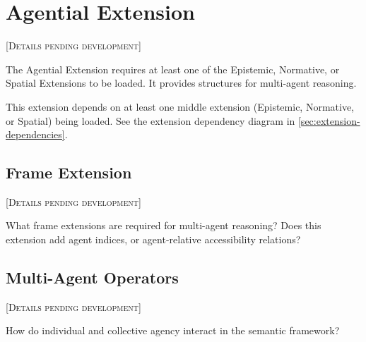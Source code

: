 \documentclass[../LogosReference.tex]{subfiles}
\begin{document}

\section{Agential Extension}\label{sec:agential}

\textsc{[Details pending development]}

The Agential Extension requires at least one of the Epistemic, Normative, or Spatial Extensions to be loaded.
It provides structures for multi-agent reasoning.

\begin{remark}[Dependency]
This extension depends on at least one middle extension (Epistemic, Normative, or Spatial) being loaded.
See the extension dependency diagram in \cref{sec:extension-dependencies}.
\end{remark}


\subsection{Frame Extension}\label{sec:agential-frame}

\textsc{[Details pending development]}

\begin{question}
What frame extensions are required for multi-agent reasoning? Does this extension add agent indices, or agent-relative accessibility relations?
\end{question}


\subsection{Multi-Agent Operators}\label{sec:agential-operators}

\textsc{[Details pending development]}

\begin{question}
How do individual and collective agency interact in the semantic framework?
\end{question}
\end{document}
